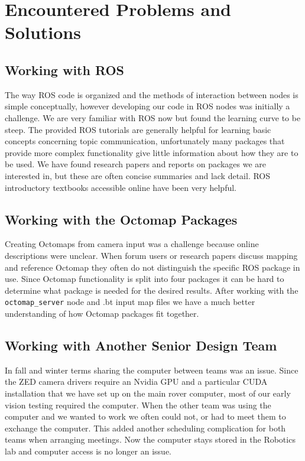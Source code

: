 \documentclass[10pt, oneside,onecolumn]{IEEEtran}
\begin{document}
\section{Encountered Problems and Solutions}
\subsection{Working with ROS}
The way ROS code is organized and the methods of interaction between nodes is simple conceptually, however developing our code in ROS nodes was initially a challenge. We are very familiar with ROS now but found the learning curve to be steep. The provided ROS tutorials are generally helpful for learning basic concepts concerning topic communication, unfortunately many packages that provide more complex functionality give little information about how they are to be used. We have found research papers and reports on packages we are interested in, but these are often concise summaries and lack detail. ROS introductory textbooks accessible online have been very helpful.

\subsection{Working with the Octomap Packages}
Creating Octomaps from camera input was a challenge because online descriptions were unclear. When forum users or research papers discuss mapping and reference Octomap they often do not distinguish the specific ROS package in use. Since Octomap functionality is split into four packages it can be hard to determine what package is needed for the desired results. After working with the \texttt{octomap\_server} node and .bt input map files we have a much better understanding of how Octomap packages fit together. 

\subsection{Working with Another Senior Design Team}
In fall and winter terms sharing the computer between teams was an issue. Since the ZED camera drivers require an Nvidia GPU and a particular CUDA installation that we have set up on the main rover computer, most of our early vision testing required the computer. When the other team was using the computer and we wanted to work we often could not, or had to meet them to exchange the computer. This added another scheduling complication for both teams when arranging meetings. Now the computer stays stored in the Robotics lab and computer access is no longer an issue. 
\end{document}
